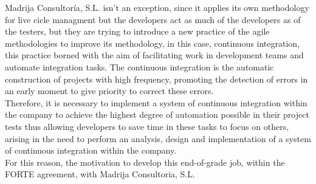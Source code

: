 Madrija Consultoría, S.L. isn't an exception, since it applies its own methodology for live cicle managment but the developers act as much of the developers as of the testers, but they are trying to introduce a new practice of the agile methodologies to improve its methodology, in this case, continuous integration, this practice borned with the aim of facilitating work in development teams and automate integration tasks. The continuous integration is the automatic construction of projects with high frequency, promoting the detection of errors in an early moment to give priority to correct these errors.\\

Therefore, it is necessary to implement a system of continuous integration within the company to achieve the highest degree of automation possible in their project tests thus allowing developers to save time in these tasks to focus on others, arising in the need to perform an analysis, design and implementation of a system of continuous integration within the company.\\

For this reason, the motivation to develop this end-of-grade job, within the FORTE agreement, with Madrija Consultoria, S.L.\\